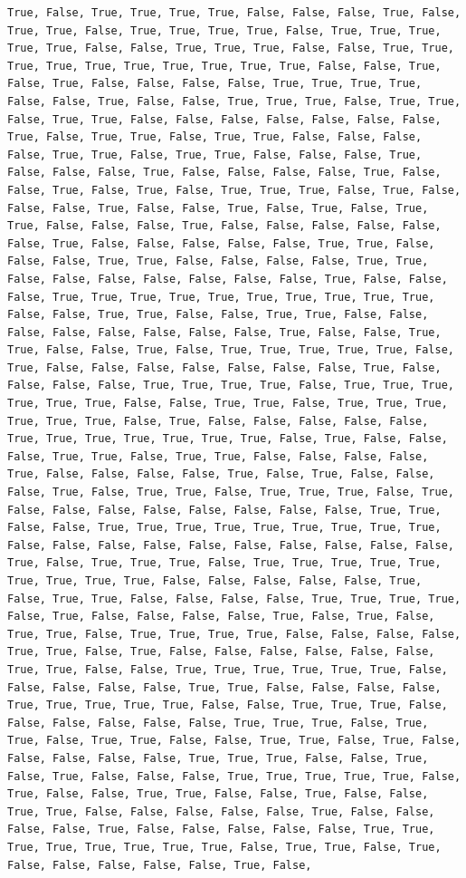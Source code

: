 \documentclass[
  letterpaper,
  DIV=11,
  numbers=noendperiod]{scrartcl}
\begin{document}
\begin{verbatim}
True, False, True, True, True, True, False, False, False, True, False, True, True, False, True, True, True, True, False, True, True, True, True, True, False, False, True, True, True, False, False, True, True, True, True, True, True, True, True, True, True, False, False, True, False, True, False, False, False, False, True, True, True, True, False, False, True, False, False, True, True, True, False, True, True, False, True, True, False, False, False, False, False, False, False, True, False, True, True, False, True, True, False, False, False, False, True, True, False, True, True, False, False, False, True, False, False, False, True, False, False, False, False, True, False, False, True, False, True, False, True, True, True, False, True, False, False, False, True, False, False, True, False, True, False, True, True, False, False, False, True, False, False, False, False, False, False, True, False, False, False, False, False, True, True, False, False, False, True, True, False, False, False, False, True, True, False, False, False, False, False, False, False, True, False, False, False, True, True, True, True, True, True, True, True, True, True, False, False, True, True, False, False, True, True, False, False, False, False, False, False, False, False, True, False, False, True, True, False, False, True, False, True, True, True, True, True, False, True, False, False, False, False, False, False, False, True, False, False, False, False, True, True, True, True, False, True, True, True, True, True, True, False, False, True, True, False, True, True, True, True, True, True, False, True, False, False, False, False, False, True, True, True, True, True, True, True, False, True, False, False, False, True, True, False, True, True, False, False, False, False, True, False, False, False, False, True, False, True, False, False, False, True, False, True, True, False, True, True, True, False, True, False, False, False, False, False, False, False, False, True, True, False, False, True, True, True, True, True, True, True, True, True, False, False, False, False, False, False, False, False, False, False, True, False, True, True, True, False, True, True, True, True, True, True, True, True, True, False, False, False, False, False, True, False, True, True, False, False, False, False, True, True, True, True, False, True, False, False, False, False, True, False, True, False, True, True, False, True, True, True, True, False, False, False, False, True, True, False, True, False, False, False, False, False, False, True, True, False, False, True, True, True, True, True, True, False, False, False, False, False, True, True, False, False, False, False, True, True, True, True, True, False, False, True, True, True, False, False, False, False, False, False, True, True, True, False, True, True, False, True, True, False, False, True, True, False, True, False, False, False, False, False, True, True, True, False, False, True, False, True, False, False, False, True, True, True, True, True, False, True, False, False, True, True, False, False, True, False, False, True, True, False, False, False, False, False, True, False, False, False, False, True, False, False, False, False, False, True, True, True, True, True, True, True, True, False, True, True, False, True, False, False, False, False, False, True, False, 
\end{verbatim}
\end{document}
